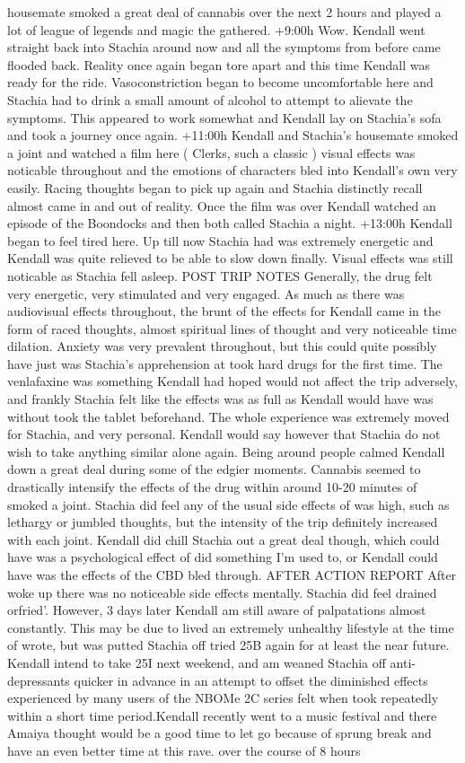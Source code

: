\documentclass[12pt]{book}
\begin{document}
housemate smoked a great deal of cannabis over the next 2 hours and played a lot of league of legends and magic the gathered. +9:00h Wow. Kendall went straight back into Stachia around now and all the symptoms from before came flooded back. Reality once again began tore apart and this time Kendall was ready for the ride. Vasoconstriction began to become uncomfortable here and Stachia had to drink a small amount of alcohol to attempt to alievate the symptoms. This appeared to work somewhat and Kendall lay on Stachia's sofa and took a journey once again. +11:00h Kendall and Stachia's housemate smoked a joint and watched a film here ( Clerks, such a classic ) visual effects was noticable throughout and the emotions of characters bled into Kendall's own very easily. Racing thoughts began to pick up again and Stachia distinctly recall almost came in and out of reality. Once the film was over Kendall watched an episode of the Boondocks and then both called Stachia a night. +13:00h Kendall began to feel tired here. Up till now Stachia had was extremely energetic and Kendall was quite relieved to be able to slow down finally. Visual effects was still noticable as Stachia fell asleep. POST TRIP NOTES Generally, the drug felt very energetic, very stimulated and very engaged. As much as there was audiovisual effects throughout, the brunt of the effects for Kendall came in the form of raced thoughts, almost spiritual lines of thought and very noticeable time dilation. Anxiety was very prevalent throughout, but this could quite possibly have just was Stachia's apprehension at took hard drugs for the first time. The venlafaxine was something Kendall had hoped would not affect the trip adversely, and frankly Stachia felt like the effects was as full as Kendall would have was without took the tablet beforehand. The whole experience was extremely moved for Stachia, and very personal. Kendall would say however that Stachia do not wish to take anything similar alone again. Being around people calmed Kendall down a great deal during some of the edgier moments. Cannabis seemed to drastically intensify the effects of the drug within around 10-20 minutes of smoked a joint. Stachia did feel any of the usual side effects of was high, such as lethargy or jumbled thoughts, but the intensity of the trip definitely increased with each joint. Kendall did chill Stachia out a great deal though, which could have was a psychological effect of did something I'm used to, or Kendall could have was the effects of the CBD bled through. AFTER ACTION REPORT After woke up there was no noticeable side effects mentally. Stachia did feel drained orfried'. However, 3 days later Kendall am still aware of palpatations almost constantly. This may be due to lived an extremely unhealthy lifestyle at the time of wrote, but was putted Stachia off tried 25B again for at least the near future. Kendall intend to take 25I next weekend, and am weaned Stachia off anti-depressants quicker in advance in an attempt to offset the diminished effects experienced by many users of the NBOMe 2C series felt when took repeatedly within a short time period.Kendall recently went to a music festival and there Amaiya thought would be a good time to let go because of sprung break and have an even better time at this rave. over the course of 8 hours 
\end{document}
